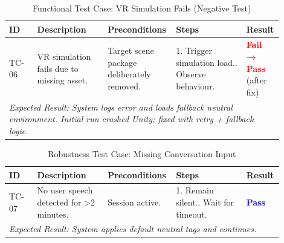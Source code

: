 \begin{table}[H]
\centering
\renewcommand{\arraystretch}{1.3}
\caption{Functional Test Case: VR Simulation Fails (Negative Test)}
\label{tab:tc_simulation_fail}
\begin{tabular}{|p{0.1\linewidth}|p{0.25\linewidth}|p{0.2\linewidth}|p{0.25\linewidth}|p{0.1\linewidth}|}
\hline
\rowcolor{gray!15} \textbf{ID} & \textbf{Description} & \textbf{Preconditions} & \textbf{Steps} & \textbf{Result} \\ \hline
TC-06 & VR simulation fails due to missing asset. & Target scene package deliberately removed. & 1. Trigger simulation load.\newline 2. Observe behaviour. & \textcolor{red}{\textbf{Fail → Pass}} (after fix) \\ \hline
\multicolumn{5}{|p{0.9\linewidth}|}{\textit{Expected Result: System logs error and loads fallback neutral environment. Initial run crashed Unity; fixed with retry + fallback logic.}} \\ \hline
\end{tabular}
\end{table}

\begin{table}[H]
\centering
\renewcommand{\arraystretch}{1.3}
\caption{Robustness Test Case: Missing Conversation Input}
\label{tab:tc_missing_conversation}
\begin{tabular}{|p{0.1\linewidth}|p{0.25\linewidth}|p{0.2\linewidth}|p{0.25\linewidth}|p{0.1\linewidth}|}
\hline
\rowcolor{gray!15} \textbf{ID} & \textbf{Description} & \textbf{Preconditions} & \textbf{Steps} & \textbf{Result} \\ \hline
TC-07 & No user speech detected for >2 minutes. & Session active. & 1. Remain silent.\newline 2. Wait for timeout. & \textcolor{blue}{\textbf{Pass}} \\ \hline
\multicolumn{5}{|p{0.9\linewidth}|}{\textit{Expected Result: System applies default neutral tags and continues.}} \\ \hline
\end{tabular}
\end{table}

